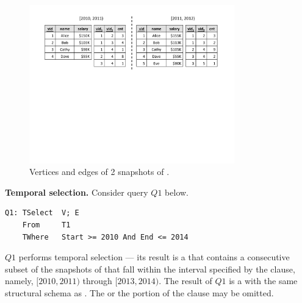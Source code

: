 \begin{figure}
\includegraphics[width=3.5in]{figs/2VE.pdf}
\caption{Vertices and edges of 2 snapshots of .}
\label{fig:2ve}
\end{figure}


{\bf Temporal selection.}  Consider query $Q1$ below.  

\begin{small}
\begin{verbatim}
Q1: TSelect  V; E
    From     T1
    TWhere   Start >= 2010 And End <= 2014
\end{verbatim}
\end{small}

$Q1$ performs temporal selection --- its result is a \tg that contains
a consecutive subset of the snapshots of  that fall within
the interval specified by the  clause, namely, $[2010,
  2011)$ through $[2013, 2014)$.  The result of $Q1$ is a \tg with the
    same structural schema as . The  or the
     portion of the  clause may be
    omitted. 

